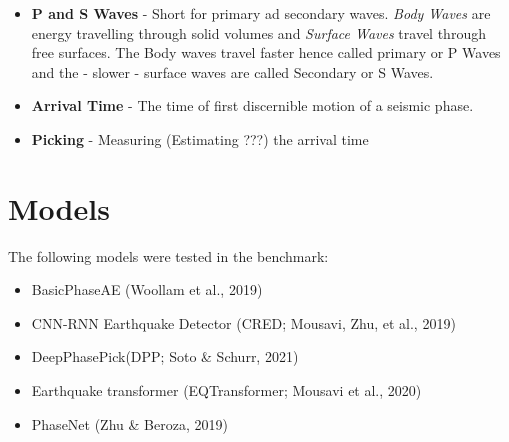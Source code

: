 \documentclass[11pt,a4paper]{article}
\begin{document}
\begin{itemize}
\item \textbf{P and S Waves} - Short for primary ad secondary waves. \textit{Body Waves} are energy travelling through solid volumes and \textit{Surface Waves} travel through free surfaces. The Body waves travel faster hence called primary or P Waves and the - slower - surface waves  are called Secondary or S Waves.


%

\item \textbf{Arrival Time} - The time of first discernible motion of a seismic phase.

\item \textbf{Picking} - Measuring (Estimating ???) the arrival time


\end{itemize}


\section{Models}
The following models were tested in the benchmark:
\begin{itemize}
\item BasicPhaseAE (Woollam et al., 2019)
\item CNN-RNN Earthquake Detector (CRED; Mousavi, Zhu, et al., 2019)
\item DeepPhasePick(DPP; Soto \& Schurr, 2021)
\item Earthquake transformer (EQTransformer; Mousavi et al., 2020)
\item PhaseNet (Zhu \& Beroza, 2019)
\end{itemize}
\end{document}
